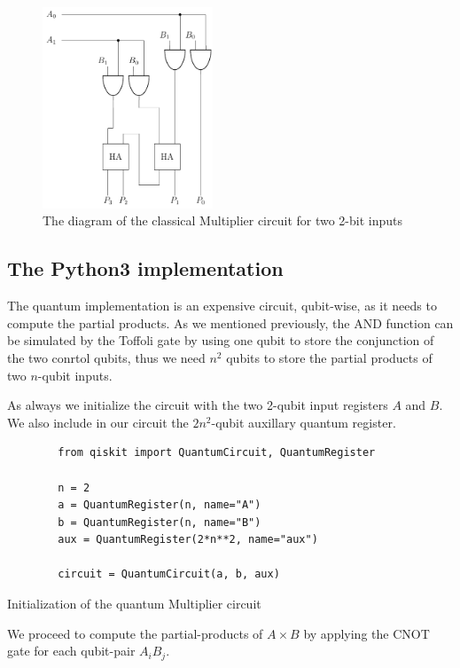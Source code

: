 \begin{figure}[ht]
    \centering
    \includegraphics[height=6cm]{images/5_Implementation/classical_2bit_multiplier.pdf}
    \caption{The diagram of the classical Multiplier circuit for two 2-bit inputs}
\end{figure}

\subsection{The Python3 implementation}

The quantum implementation is an expensive circuit, qubit-wise, as it needs to compute the
partial products. As we mentioned previously, the AND function can be simulated by the Toffoli gate
by using one  qubit to store the conjunction of the two conrtol qubits, thus we
need $n^2$ qubits to store the partial products of two $n$-qubit inputs.

As always we initialize the circuit with the two 2-qubit input registers $A$ and $B$. We also
include in our circuit the $2n^2$-qubit auxillary quantum register.

\begin{listing}[ht]
    \centering
    \begin{verbatim}
        from qiskit import QuantumCircuit, QuantumRegister

        n = 2
        a = QuantumRegister(n, name="A")
        b = QuantumRegister(n, name="B")
        aux = QuantumRegister(2*n**2, name="aux")

        circuit = QuantumCircuit(a, b, aux)
    \end{verbatim}
    \caption{Initialization of the quantum Multiplier circuit}
\end{listing}

We proceed to compute the partial-products of $A \times B$ by applying the CNOT gate for each
qubit-pair $A_iB_j$.

